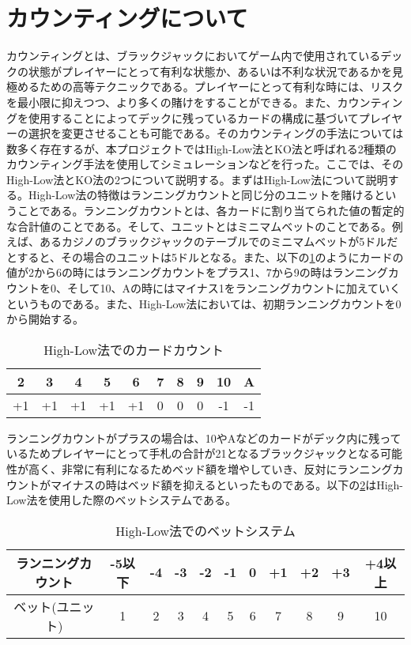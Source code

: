\section{カウンティングについて}
カウンティングとは、ブラックジャックにおいてゲーム内で使用されているデックの状態がプレイヤーにとって有利な状態か、あるいは不利な状況であるかを見極めるための高等テクニックである。プレイヤーにとって有利な時には、リスクを最小限に抑えつつ、より多くの賭けをすることができる。また、カウンティングを使用することによってデックに残っているカードの構成に基づいてプレイヤーの選択を変更させることも可能である。そのカウンティングの手法については数多く存在するが、本プロジェクトではHigh-Low法とKO法と呼ばれる2種類のカウンティング手法を使用してシミュレーションなどを行った。ここでは、そのHigh-Low法とKO法の2つについて説明する。まずはHigh-Low法について説明する。High-Low法の特徴はランニングカウントと同じ分のユニットを賭けるということである。ランニングカウントとは、各カードに割り当てられた値の暫定的な合計値のことである。そして、ユニットとはミニマムベットのことである。例えば、あるカジノのブラックジャックのテーブルでのミニマムベットが5ドルだとすると、その場合のユニットは5ドルとなる。また、以下の\ref{hlc}のようにカードの値が2から6の時にはランニングカウントをプラス1、7から9の時はランニングカウントを0、そして10、Aの時にはマイナス1をランニングカウントに加えていくというものである。また、High-Low法においては、初期ランニングカウントを0から開始する。

  \begin{table}[H]
    \centering
    \begin{tabular}{|c|c|c|c|c|c|c|c|c|c|} \hline
    2&3&4&5&6&7&8&9&10&A \\ \hline
    +1&+1&+1&+1&+1&0&0&0&-1&-1 \\ \hline
    \end{tabular}
    \caption{High-Low法でのカードカウント}
    \label{hlc}
  \end{table}

ランニングカウントがプラスの場合は、10やAなどのカードがデック内に残っているためプレイヤーにとって手札の合計が21となるブラックジャックとなる可能性が高く、非常に有利になるためベッド額を増やしていき、反対にランニングカウントがマイナスの時はベッド額を抑えるといったものである。以下の\ref{hlb}はHigh-Low法を使用した際のベットシステムである。

  \begin{table}[H]
    \centering
    \begin{tabular}{|c|c|c|c|c|c|c|c|c|c|c|} \hline
      ランニングカウント&-5以下&-4&-3&-2&-1&0&+1&+2&+3&+4以上 \\ \hline
      ベット(ユニット)&1&2&3&4&5&6&7&8&9&10 \\ \hline
    \end{tabular}
    \caption{High-Low法でのベットシステム}
    \label{hlb}
  \end{table}


